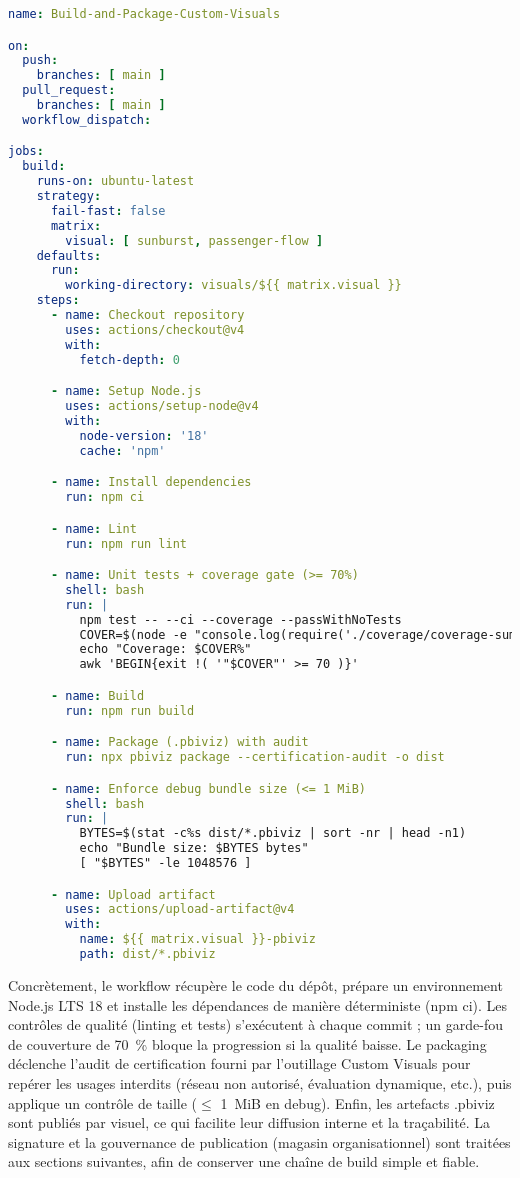 \begin{lstlisting}[language=yaml,
  caption={Pipeline GitHub Actions — build, tests, packaging .pbiviz},
  label={lst:ci-cd-pipeline},
  breaklines=true, breakatwhitespace=true, columns=fullflexible, keepspaces=true, basicstyle=\ttfamily\footnotesize]
name: Build-and-Package-Custom-Visuals

on:
  push:
    branches: [ main ]
  pull_request:
    branches: [ main ]
  workflow_dispatch:

jobs:
  build:
    runs-on: ubuntu-latest
    strategy:
      fail-fast: false
      matrix:
        visual: [ sunburst, passenger-flow ]
    defaults:
      run:
        working-directory: visuals/${{ matrix.visual }}
    steps:
      - name: Checkout repository
        uses: actions/checkout@v4
        with:
          fetch-depth: 0

      - name: Setup Node.js
        uses: actions/setup-node@v4
        with:
          node-version: '18'
          cache: 'npm'

      - name: Install dependencies
        run: npm ci

      - name: Lint
        run: npm run lint

      - name: Unit tests + coverage gate (>= 70%)
        shell: bash
        run: |
          npm test -- --ci --coverage --passWithNoTests
          COVER=$(node -e "console.log(require('./coverage/coverage-summary.json').total.statements.pct)")
          echo "Coverage: $COVER%"
          awk 'BEGIN{exit !( '"$COVER"' >= 70 )}'

      - name: Build
        run: npm run build

      - name: Package (.pbiviz) with audit
        run: npx pbiviz package --certification-audit -o dist

      - name: Enforce debug bundle size (<= 1 MiB)
        shell: bash
        run: |
          BYTES=$(stat -c%s dist/*.pbiviz | sort -nr | head -n1)
          echo "Bundle size: $BYTES bytes"
          [ "$BYTES" -le 1048576 ]

      - name: Upload artifact
        uses: actions/upload-artifact@v4
        with:
          name: ${{ matrix.visual }}-pbiviz
          path: dist/*.pbiviz
\end{lstlisting}

Concrètement, le workflow récupère le code du dépôt, prépare un environnement Node.js LTS 18 et installe les dépendances de manière déterministe (npm ci). Les contrôles de qualité (linting et tests) s’exécutent à chaque commit ; un garde-fou de couverture de 70~\% bloque la progression si la qualité baisse. Le packaging déclenche l’audit de certification fourni par l’outillage Custom Visuals pour repérer les usages interdits (réseau non autorisé, évaluation dynamique, etc.), puis applique un contrôle de taille (\(\leq\) 1~MiB en debug). Enfin, les artefacts .pbiviz sont publiés par visuel, ce qui facilite leur diffusion interne et la traçabilité. La signature et la gouvernance de publication (magasin organisationnel) sont traitées aux sections suivantes, afin de conserver une chaîne de build simple et fiable.
